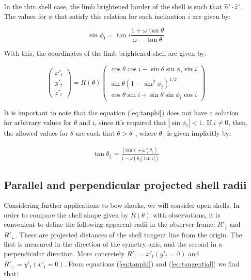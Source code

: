 In the thin shell case, the limb brightened border of the shell is such that $\hat{n}'\cdot \hat{z}'$. 
The values for $\phi$ that satisfy this relation for each inclination $i$ are given by:

\begin{equation}
\sin\phi_t = \tan i \frac{1+\omega\tan\theta}{\omega-\tan\theta}
\label{eq:tanphi}
\end{equation}

With this, the coordinates of the limb brightened shell are given by:

\begin{equation}
\left(\begin{array}{c}
x'_t \\ y'_t \\ z'_t
\end{array}\right)= R(\theta)\left(\begin{array}{c}
\cos\theta\cos i - \sin\theta\sin\phi_t \sin i \\
\sin\theta(1-\sin^2\phi_t)^{1/2} \\
\cos\theta\sin i +\sin\theta\sin\phi_t\cos i
\end{array}\right)
\label{eq:tangential}
\end{equation} 

It is important to note that the equation (\ref{eq:tanphi}) does not have a solution for arbitrary values for $\theta$ and $i$, since
it's required that $|\sin\phi_t|<1$. If $i\neq 0$, then, the  allowed values for $\theta$ are such that $\theta > \theta_\parallel$, where
$\theta_\parallel$ is given implicitly by:

\begin{align}
\tan\theta_\parallel = \frac{|\tan i| + \omega(\theta_\parallel)}{1-\omega(\theta_\parallel |\tan i|)}
\label{eq:thetapar}
\end{align}

\subsection{Parallel and perpendicular projected shell radii}

Considering further applications to bow shocks, we will consider open shells. In order to compare the shell shape given by $R(\theta)$ with observations,
it is convenient to define the following apparent radii in the observer frame: $R'_\parallel$ and $R'_\perp$. These are projected distances of the shell tangent line
from the origin. The first is measured in the direction of the symetry axis, and the second in a perpendicular direction. More concretely $R'_\parallel = x'_t(y'_t=0)$
and $R'_\perp = y'_t(x'_t=0)$. From equations (\ref{eq:tanphi}) and (\ref{eq:tangential}) we find that:

